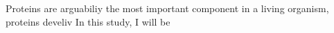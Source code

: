 Proteins are arguabiliy the most important component in a living organism, proteins develiv  In this study, I will be 